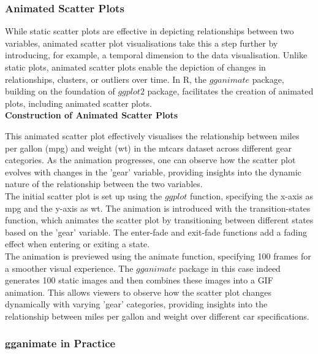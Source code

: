 \documentclass{article}\usepackage[]{graphicx}\usepackage[]{xcolor}
\numberwithin{equation}{section}
\begin{document}
\subsubsection{Animated Scatter Plots}
\noindent While static scatter plots are effective in depicting relationships between two variables, animated scatter plot visualisations take this a step further by introducing, for example, a temporal dimension to the data visualisation. Unlike static plots, animated scatter plots enable the depiction of changes in relationships, clusters, or outliers over time. In R, the $gganimate$ package, building on the foundation of $ggplot2$ package, facilitates the creation of animated plots, including animated scatter plots. \\

\noindent \textbf{Construction of Animated Scatter Plots}\\
\noindent 


\noindent This animated scatter plot effectively visualises the relationship between miles per gallon (mpg) and weight (wt) in the mtcars dataset across different gear categories. As the animation progresses, one can observe how the scatter plot evolves with changes in the 'gear' variable, providing insights into the dynamic nature of the relationship between the two variables.\\

\noindent The initial scatter plot is set up using the $ggplot$ function, specifying the x-axis as mpg and the y-axis as wt. The animation is introduced with the transition-states function, which animates the scatter plot by transitioning between different states based on the 'gear' variable. The enter-fade and exit-fade functions add a fading effect when entering or exiting a state.\\

\noindent The animation is previewed using the animate function, specifying 100 frames for a smoother visual experience.  The $gganimate$ package in this case indeed generates 100 static images and then combines these images into a GIF animation. This allows viewers to observe how the scatter plot changes dynamically with varying 'gear' categories, providing insights into the relationship between miles per gallon and weight over different car specifications.\\

\noindent
\subsubsection{gganimate in Practice}\\
\end{document}
